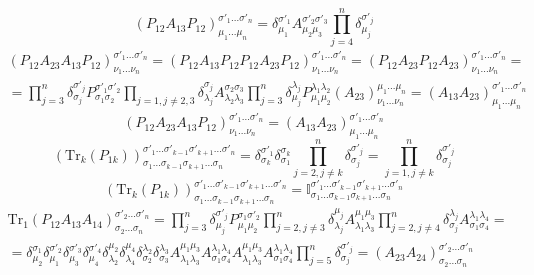 \documentclass[12pt]{article}
\theoremstyle{definition}
\begin{document}
\begin{enumerate}
\begin{itemize}
\begin{multline}
        \end{multline}
        \begin{equation}
            \boxed{(P_{12}A_{13}P_{12})^{\sigma'_1...\sigma'_n}_{\mu_1...\mu_n}=\delta^{\sigma'_1}_{\mu_1}A^{\sigma'_2\sigma'_3}_{\mu_2\mu_3}\prod\limits_{j=4}^n\delta^{\sigma'_j}_{\mu_j}}
        \end{equation}
        \begin{multline}
            (P_{12}A_{23}A_{13}P_{12})^{\sigma'_1...\sigma'_n}_{\nu_1...\nu_n}=(P_{12}A_{13}P_{12}P_{12}A_{23}P_{12})^{\sigma'_1...\sigma'_n}_{\nu_1...\nu_n}=(P_{12}A_{23}P_{12}A_{23})^{\sigma'_1...\sigma'_n}_{\nu_1...\nu_n}=\\=\prod\limits_{j=3}^n\delta^{\sigma'_j}_{\sigma_j}P^{\sigma'_1\sigma'_2}_{\sigma_1\sigma_2}\prod\limits_{j=1,j\neq2,3}\delta^{\sigma_j}_{\lambda_j}A^{\sigma_2\sigma_3}_{\lambda_2\lambda_3}\prod\limits_{j=3}^n\delta^{\lambda_j}_{\mu_j}P^{\lambda_1\lambda_2}_{\mu_1\mu_2}(A_{23})^{\mu_1...\mu_n}_{\nu_1...\nu_n}=(A_{13}A_{23})^{\sigma'_1...\sigma'_n}_{\mu_1...\mu_n}
        \end{multline}
        \begin{equation}
            \boxed{(P_{12}A_{23}A_{13}P_{12})^{\sigma'_1...\sigma'_n}_{\nu_1...\nu_n}=(A_{13}A_{23})^{\sigma'_1...\sigma'_n}_{\mu_1...\mu_n}}
        \end{equation}
        \begin{equation}
            (\text{Tr}_k(P_{1k}))^{\sigma'_1...\sigma'_{k-1}\sigma'_{k+1}...\sigma'_n}_{\sigma_1...\sigma_{k-1}\sigma_{k+1}...\sigma_n}=\delta^{\sigma'_1}_{\sigma_k}\delta^{\sigma_k}_{\sigma_1}\prod\limits_{j=2,j\neq k}^n\delta^{\sigma'_j}_{\sigma_j}=\prod\limits_{j=1,j\neq k}^n\delta^{\sigma'_j}_{\sigma_j}
        \end{equation}
        \begin{equation}
            \boxed{(\text{Tr}_k(P_{1k}))^{\sigma'_1...\sigma'_{k-1}\sigma'_{k+1}...\sigma'_n}_{\sigma_1...\sigma_{k-1}\sigma_{k+1}...\sigma_n}=\mathbb{I}^{\sigma'_1...\sigma'_{k-1}\sigma'_{k+1}...\sigma'_n}_{\sigma_1...\sigma_{k-1}\sigma_{k+1}...\sigma_n}}
        \end{equation}
        \begin{multline}
            \text{Tr}_1(P_{12}A_{13}A_{14})^{\sigma'_2...\sigma'_n}_{\sigma_2...\sigma_n}=\prod\limits_{j=3}^n\delta^{\sigma'_j}_{\mu_j}P^{\sigma_1\sigma'_2}_{\mu_1\mu_2}\prod\limits_{j=2,j\neq3}^n\delta^{\mu_j}_{\lambda_j}A^{\mu_1\mu_3}_{\lambda_1\lambda_3}\prod\limits_{j=2,j\neq4}^n\delta^{\lambda_j}_{\sigma_j}A^{\lambda_1\lambda_4}_{\sigma_1\sigma_4}=\\=\delta^{\sigma_1}_{\mu_2}\delta^{\sigma'_2}_{\mu_1}\delta^{\sigma'_3}_{\mu_3}\delta^{\sigma'_4}_{\mu_4}\delta^{\mu_2}_{\lambda_2}\delta^{\mu_4}_{\lambda_4}\delta^{\lambda_2}_{\sigma_2}\delta^{\lambda_3}_{\sigma_3}A^{\mu_1\mu_3}_{\lambda_1\lambda_3}A^{\lambda_1\lambda_4}_{\sigma_1\sigma_4}A^{\mu_1\mu_3}_{\lambda_1\lambda_3}A^{\lambda_1\lambda_4}_{\sigma_1\sigma_4}\prod\limits_{j=5}^n\delta^{\sigma'_j}_{\sigma_j}=(A_{23}A_{24})^{\sigma'_2...\sigma'_n}_{\sigma_2...\sigma_n}

\end{multline}
\end{itemize}
\end{enumerate}
\end{document}
